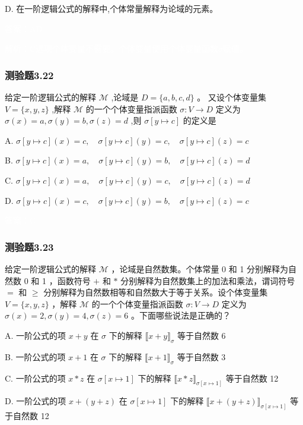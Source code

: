 \documentclass[UTF8, heading=true]{ctexart}
\begin{document}
D. 在一阶逻辑公式的解释中,个体常量解释为论域的元素。

\textcolor{white}{答案：AD}

\textcolor{white}{解析：C选项个体变量不需要。个体变量使用个体变量函数$\sigma$赋值。}

\subsubsection{测验题3.22}

给定一阶逻辑公式的解释 $\mathcal{M}$ ,论域是 $D=\{a, b, c, d\}$ 。 又设个体变量集 $V=\{x, y, z\}$ ,解释 $\mathcal{M}$ 的一个个体变量指派函数 $\sigma: V \rightarrow D$ 定义为 $\sigma(x)=a, \sigma(y)=b, \sigma(z)=d$ ,则 $\sigma[y \mapsto c]$ 的定义是 $\qquad$

A. $\sigma[y \mapsto c](x)=c, \quad \sigma[y \mapsto c](y)=c, \quad \sigma[y \mapsto c](z)=c$

B. $\sigma[y \mapsto c](x)=a, \quad \sigma[y \mapsto c](y)=b, \quad \sigma[y \mapsto c](z)=d$ 

C. $\sigma[y \mapsto c](x)=a, \quad \sigma[y \mapsto c](y)=c, \quad \sigma[y \mapsto c](z)=d$ 

D. $\sigma[y \mapsto c](x)=c, \quad \sigma[y \mapsto c](y)=b, \quad \sigma[y \mapsto c](z)=c$

\textcolor{white}{答案：C}

\subsubsection{测验题3.23}

给定一阶逻辑公式的解释 $\mathcal{M}$ ，论域是自然数集。个体常量 0 和 1 分别解释为自然数 0 和 1 ，函数符号 $+$ 和 $*$ 分别解释为自然数集上的加法和乘法，谓词符号 $=$ 和 $\geq$ 分别解释为自然数相等和自然数大于等于关系。设个体变量集 $V=\{x, y, z\}$ ，解释 $\mathcal{M}$ 的一个个体变量指派函数 $\sigma: V \rightarrow D$ 定义为 $\sigma(x)=2, \sigma(y)=4, \sigma(z)=6$ 。下面哪些说法是正确的？

A. 一阶公式的项 $x+y$ 在 $\sigma$ 下的解释 $\llbracket x+y \rrbracket_\sigma$ 等于自然数 6

B. 一阶公式的项 $x+1$ 在 $\sigma$ 下的解释 $\llbracket x+1 \rrbracket_\sigma$ 等于自然数 3

C. 一阶公式的项 $x * z$ 在 $\sigma[x \mapsto 1]$ 下的解释 $\llbracket x * z \rrbracket_{\sigma[x \mapsto 1]}$ 等于自然数 12

D.  一阶公式的项 $x+(y+z)$ 在 $\sigma[x \mapsto 1]$ 下的解释 $\llbracket x+(y+z) \rrbracket_{\sigma[x \mapsto 1]}$ 等于自然数 12
\end{document}
